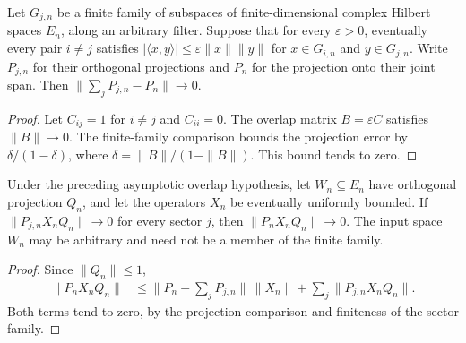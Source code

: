 \begin{lemma}
    \label{thm:sector_projection_sum_error_decay}
    \leanok
    Let $G_{j,n}$ be a finite family of subspaces of finite-dimensional
    complex Hilbert spaces $E_n$, along an arbitrary filter. Suppose that
    for every $\varepsilon>0$, eventually every pair $i\neq j$ satisfies
    $|\langle x,y\rangle|\leq\varepsilon\|x\|\|y\|$ for
    $x\in G_{i,n}$ and $y\in G_{j,n}$. Write $P_{j,n}$ for their
    orthogonal projections and $P_n$ for the projection onto their joint span.
    Then $\|\sum_jP_{j,n}-P_n\|\to0$.
\end{lemma}
\begin{proof}\leanok
    Let $C_{ij}=1$ for $i\neq j$ and $C_{ii}=0$. The overlap matrix
    $B=\varepsilon C$ satisfies $\|B\|\to0$. The finite-family comparison
    bounds the projection error by $\delta/(1-\delta)$, where
    $\delta=\|B\|/(1-\|B\|)$. This bound tends to zero.
\end{proof}

\begin{lemma}
    \label{thm:sector_compression_assembly}
    \leanok
    Under the preceding asymptotic overlap hypothesis, let $W_n\subseteq E_n$
    have orthogonal projection $Q_n$, and let the operators $X_n$ be
    eventually uniformly bounded. If $\|P_{j,n}X_nQ_n\|\to0$ for every
    sector $j$, then $\|P_nX_nQ_n\|\to0$. The input space $W_n$ may be
    arbitrary and need not be a member of the finite family.
\end{lemma}
\begin{proof}\leanok
    Since $\|Q_n\|\leq1$,
    \begin{align}
        \|P_nX_nQ_n\|
         & \leq\|P_n-\textstyle\sum_jP_{j,n}\|\,\|X_n\|
        +\sum_j\|P_{j,n}X_nQ_n\|.
    \end{align}
    Both terms tend to zero, by the projection comparison and finiteness
    of the sector family.
\end{proof}

